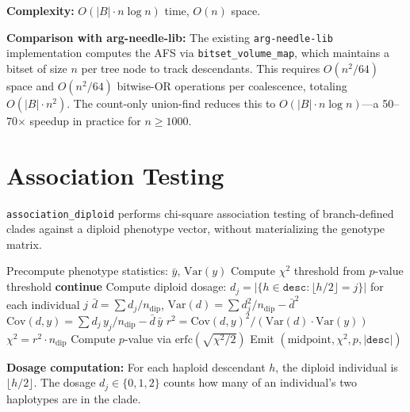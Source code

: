 \documentclass[11pt]{article}
\begin{document}
\textbf{Complexity:} $O(|B| \cdot n \log n)$ time, $O(n)$ space.

\textbf{Comparison with arg-needle-lib:}  The existing \texttt{arg-needle-lib}
implementation computes the AFS via \texttt{bitset\_volume\_map}, which
maintains a bitset of size $n$ per tree node to track descendants.  This
requires $O(n^2 / 64)$ space and $O(n^2 / 64)$ bitwise-OR operations per
coalescence, totaling $O(|B| \cdot n^2)$.  The count-only union-find
reduces this to $O(|B| \cdot n \log n)$---a 50--70$\times$ speedup in
practice for $n \ge 1000$.

\section{Association Testing}

\texttt{association\_diploid} performs chi-square association testing of
branch-defined clades against a diploid phenotype vector, without
materializing the genotype matrix.

\begin{algorithm}[h]
\caption{\texttt{association\_diploid}: Clade-based association}
\begin{algorithmic}[1]
\State Precompute phenotype statistics: $\bar{y}$, $\text{Var}(y)$
\State Compute $\chi^2$ threshold from $p$-value threshold
        \State \textbf{continue} 
    \EndIf
    \State Compute diploid dosage: $d_j = |\{h \in \texttt{desc} : \lfloor h/2 \rfloor = j\}|$ for each individual $j$
    \State $\bar{d} = \sum d_j / n_\text{dip}$, \; $\text{Var}(d) = \sum d_j^2 / n_\text{dip} - \bar{d}^2$
    \State $\text{Cov}(d, y) = \sum d_j \, y_j / n_\text{dip} - \bar{d}\,\bar{y}$
    \State $r^2 = \text{Cov}(d, y)^2 / (\text{Var}(d) \cdot \text{Var}(y))$
    \State $\chi^2 = r^2 \cdot n_\text{dip}$
        \State Compute $p$-value via $\text{erfc}(\sqrt{\chi^2 / 2})$
        \State Emit $(\text{midpoint}, \chi^2, p, |\texttt{desc}|)$
    \EndIf
\EndFor
\end{algorithmic}
\end{algorithm}

\textbf{Dosage computation:}  For each haploid descendant $h$, the diploid
individual is $\lfloor h/2 \rfloor$.  The dosage $d_j \in \{0, 1, 2\}$
counts how many of an individual's two haplotypes are in the clade.
\end{document}
